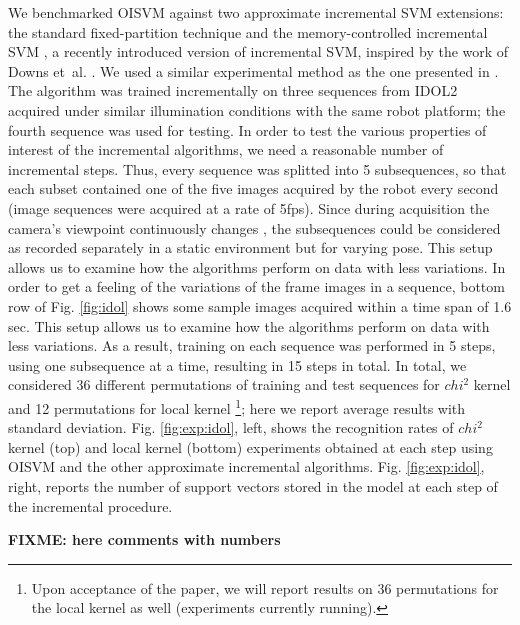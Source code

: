 We benchmarked  OISVM against two approximate incremental SVM extensions:
the standard fixed-partition technique \cite{ijcai99} and the memory-controlled
incremental SVM \cite{luo:icra07}, a recently introduced version of incremental
SVM, inspired by the work of Downs et~al. \cite{DownsGM01}. We used a similar
experimental method as the one presented in \cite{luo:icra07}. The algorithm was
trained incrementally on three sequences from IDOL2 acquired under similar
illumination conditions with the same robot platform; the fourth sequence was
used for testing. In order to test the various properties of interest of the
incremental algorithms, we need a reasonable number of incremental steps.
Thus, every sequence was splitted into 5 subsequences, so that each subset 
contained one of the five images acquired by the robot every second (image
sequences were acquired at a rate of 5fps). Since during acquisition the camera's
viewpoint continuously changes \cite{luo:icra07}, the subsequences could be
considered as recorded separately in a static environment but for varying pose.
This setup allows us to examine how the algorithms perform on data with less
variations. In order to get a feeling of the variations of the frame images in a
sequence, bottom row of Fig. \ref{fig:idol} shows some sample images acquired
within a time span of 1.6 sec. This setup allows us to examine how the algorithms
perform on data with less variations. As a result, training on each sequence was
performed in 5 steps, using one subsequence at a time, resulting in 15 steps in 
total. In total, we considered 36 different permutations of training and test
sequences for $chi^2$ kernel and 12 permutations for local kernel 
\footnote{Upon acceptance of the paper, we will report results
on 36 permutations for the local kernel as well (experiments currently running).}; 
here we report average results with standard deviation. 
Fig. \ref{fig:exp:idol}, left, shows the recognition rates of $chi^2$ kernel (top)
and local kernel (bottom) experiments obtained at each step using OISVM and the
other approximate incremental algorithms. Fig. \ref{fig:exp:idol}, right, reports
the number of support vectors stored in the model at each step of the incremental
procedure.

\textbf{FIXME: here comments with numbers}


